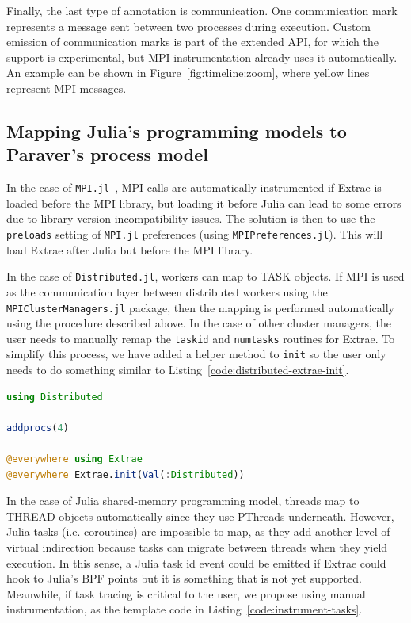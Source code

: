 \documentclass{juliacon}
\newcommand{\jlpkg}[1]{\texttt{#1}}
\begin{document}
Finally, the last type of annotation is communication. One communication mark represents a message sent between two processes during execution. Custom emission of communication marks is part of the extended API, for which the support is experimental, but MPI instrumentation already uses it automatically. An example can be shown in Figure~\ref{fig:timeline:zoom}, where yellow lines represent MPI messages.

\subsection{Mapping Julia's programming models to Paraver's process model}

In the case of \jlpkg{MPI.jl}~\cite{byrne2021mpi}, MPI calls are automatically instrumented if Extrae is loaded before the MPI library, but loading it before Julia can lead to some errors due to library version incompatibility issues.
The solution is then to use the \texttt{preloads} setting of \jlpkg{MPI.jl} preferences (using \jlpkg{MPIPreferences.jl}). This will load Extrae after Julia but before the MPI library.

In the case of \jlpkg{Distributed.jl}, workers can map to TASK objects. If MPI is used as the communication layer between distributed workers using the \jlpkg{MPIClusterManagers.jl} package, then the mapping is performed automatically using the procedure described above.
In the case of other cluster managers, the user needs to manually remap the \texttt{taskid} and \texttt{numtasks} routines for Extrae. To simplify this process, we have added a helper method to \texttt{init} so the user only needs to do something similar to Listing~\ref{code:distributed-extrae-init}.

\begin{lstlisting}[language=Julia, label=code:distributed-extrae-init, caption=Manual initialization of Extrae on a Distributed.jl workflow.]
using Distributed

addprocs(4)

@everywhere using Extrae
@everywhere Extrae.init(Val(:Distributed))
\end{lstlisting}

In the case of Julia shared-memory programming model, threads map to THREAD objects automatically since they use PThreads underneath.
However, Julia tasks (i.e. coroutines) are impossible to map, as they add another level of virtual indirection because tasks can migrate between threads when they yield execution.
In this sense, a Julia task id event could be emitted if Extrae could hook to Julia's BPF points but it is something that is not yet supported.
Meanwhile, if task tracing is critical to the user, we propose using manual instrumentation, as the template code in Listing~\ref{code:instrument-tasks}.
\end{document}
